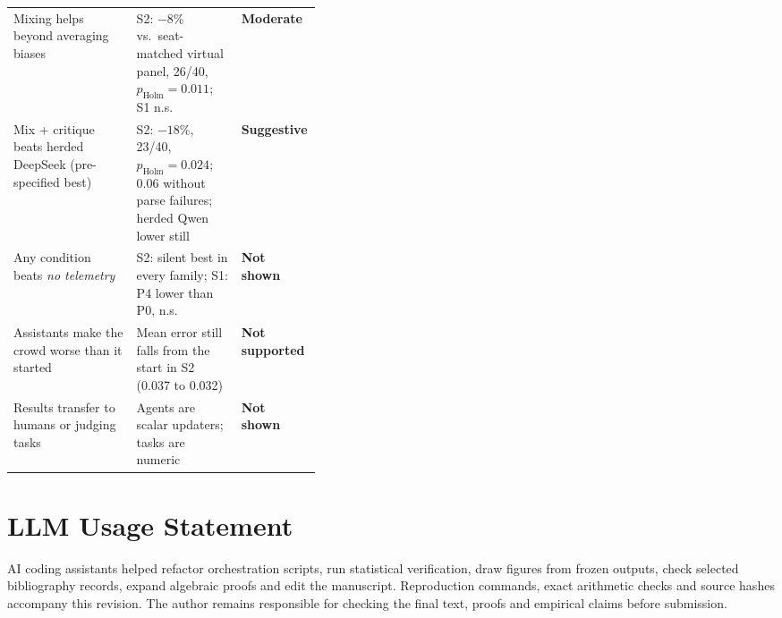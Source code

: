 \documentclass[10pt]{article}
\theoremstyle{manuscript}\newtheorem{proposition}{Proposition}
\newcommand{\pH}{p_{\text{Holm}}}
\newcommand{\moderate}{\textcolor{mid}{\textbf{Moderate}}}
\newcommand{\weakc}{\textcolor{weak}{\textbf{Not shown}}}
\newcommand{\suggest}{\textcolor{mid}{\textbf{Suggestive}}}
\newcommand{\notsup}{\textcolor{weak}{\textbf{Not supported}}}
\begin{document}
\begin{tcolorbox}[enhanced,colback=gray!4,colframe=gray!50,boxrule=0.5pt,arc=1pt,left=6pt,right=6pt,top=4pt,bottom=4pt,title={\small\textbf{Claims ledger}},coltitle=black,colbacktitle=gray!15,fonttitle=\small]
\begin{tabularx}{\linewidth}{@{}>{\raggedright\arraybackslash}p{0.40\linewidth}>{\raggedright\arraybackslash}Xl@{}}
Mixing helps beyond averaging biases & S2: $-8\%$ vs.\ seat-matched virtual panel, 26/40, $\pH=0.011$; S1 n.s. & \moderate\\
Mix + critique beats herded DeepSeek (pre-specified best) & S2: $-18\%$, 23/40, $\pH=0.024$; 0.06 without parse failures; herded Qwen lower still & \suggest\\
Any condition beats \emph{no telemetry} & S2: silent best in every family; S1: P4 lower than P0, n.s. & \weakc\\
Assistants make the crowd worse than it started & Mean error still falls from the start in S2 (0.037 to 0.032) & \notsup\\
Results transfer to humans or judging tasks & Agents are scalar updaters; tasks are numeric & \weakc\\
\end{tabularx}
\end{tcolorbox}


\FloatBarrier
\section*{LLM Usage Statement}
AI coding assistants helped refactor orchestration scripts, run statistical verification, draw figures from frozen outputs, check selected bibliography records, expand algebraic proofs and edit the manuscript. Reproduction commands, exact arithmetic checks and source hashes accompany this revision. The author remains responsible for checking the final text, proofs and empirical claims before submission.
\end{document}
